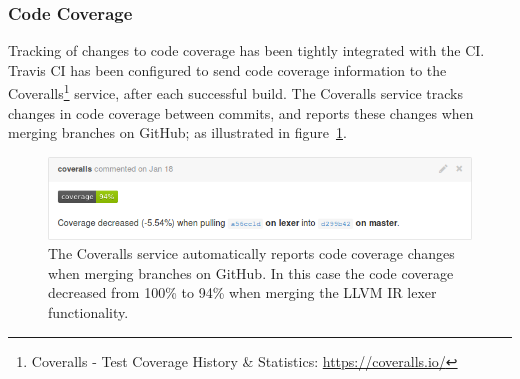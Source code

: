 
\subsubsection{Code Coverage}

Tracking of changes to code coverage has been tightly integrated with the CI. Travis CI has been configured to send code coverage information to the Coveralls\footnote{Coveralls - Test Coverage History \& Statistics: \url{https://coveralls.io/}} service, after each successful build. The Coveralls service tracks changes in code coverage between commits, and reports these changes when merging branches on GitHub; as illustrated in figure~\ref{fig:coveralls}.

\begin{figure}[htbp]
	\begin{center}
		\includegraphics[width=\textwidth]{inc/8_ver/coveralls.png}
		\caption{The Coveralls service automatically reports code coverage changes when merging branches on GitHub. In this case the code coverage decreased from 100\% to 94\% when merging the LLVM IR lexer functionality.}
		\label{fig:coveralls}
	\end{center}
\end{figure}
